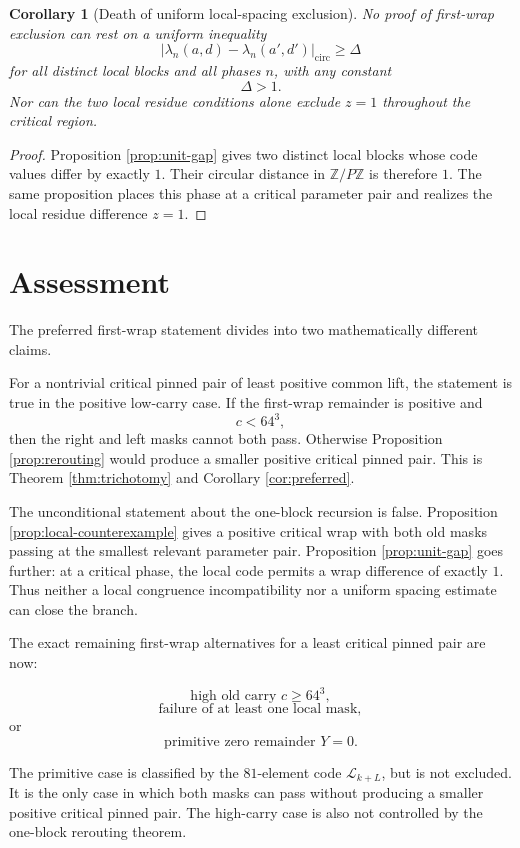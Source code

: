 \documentclass[11pt]{article}
\newtheorem{corollary}[theorem]{Corollary}
\theoremstyle{remark}
\newcommand{\Z}{\mathbb{Z}}
\newcommand{\Lset}{\mathcal{L}}
\begin{document}
\begin{corollary}[Death of uniform local-spacing exclusion]
\label{cor:spacing-dead}
No proof of first-wrap exclusion can rest on a uniform inequality
\[
\left|
\lambda_n(a,d)-\lambda_n(a',d')
\right|_{\mathrm{circ}}
\ge\Delta
\]
for all distinct local blocks and all phases \(n\), with any constant
\[
\Delta>1.
\]
Nor can the two local residue conditions alone exclude \(z=1\) throughout the critical region.
\end{corollary}

\begin{proof}
Proposition \ref{prop:unit-gap} gives two distinct local blocks whose code values differ by exactly \(1\).  Their circular distance in \(\Z/P\Z\) is therefore \(1\).  The same proposition places this phase at a critical parameter pair and realizes the local residue difference \(z=1\).
\end{proof}

\section{Assessment}

The preferred first-wrap statement divides into two mathematically different claims.

For a nontrivial critical pinned pair of least positive common lift, the statement is true in the positive low-carry case.  If the first-wrap remainder is positive and
\[
c<64^3,
\]
then the right and left masks cannot both pass.  Otherwise Proposition \ref{prop:rerouting} would produce a smaller positive critical pinned pair.  This is Theorem \ref{thm:trichotomy} and Corollary \ref{cor:preferred}.

The unconditional statement about the one-block recursion is false.  Proposition \ref{prop:local-counterexample} gives a positive critical wrap with both old masks passing at the smallest relevant parameter pair.  Proposition \ref{prop:unit-gap} goes further: at a critical phase, the local code permits a wrap difference of exactly \(1\).  Thus neither a local congruence incompatibility nor a uniform spacing estimate can close the branch.

The exact remaining first-wrap alternatives for a least critical pinned pair are now:

\[
\text{high old carry }c\ge64^3,
\]
\[
\text{failure of at least one local mask},
\]
or
\[
\text{primitive zero remainder }Y=0.
\]

The primitive case is classified by the \(81\)-element code \(\Lset_{k+L}\), but is not excluded.  It is the only case in which both masks can pass without producing a smaller positive critical pinned pair.  The high-carry case is also not controlled by the one-block rerouting theorem.
\end{document}
